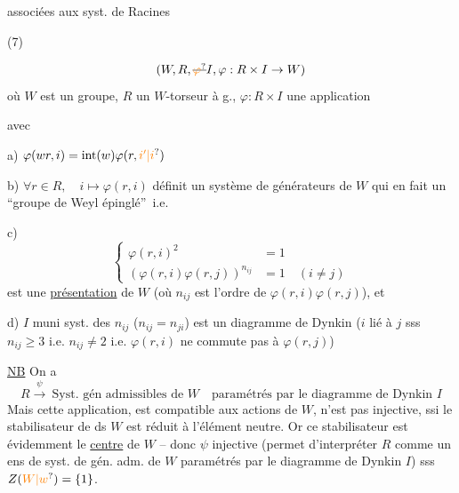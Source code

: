 \begin{flushright}
 associées aux syst. de Racines

(7)
\end{flushright}

\[
(W,R,\deleted{\unsure{\varphi}}I,\varphi:R\times I\to W)
\]
où $W$ est un groupe, $R$ un $W$-torseur à g.,  $\varphi:R\times I$ une  application

avec

a) $\varphi(wr,i)=\operatorname{int}(w)\varphi(r,\unsure{i'|i})$

b) $\forall r\in R,\quad i\mapsto\varphi(r,i)$ définit un système de générateurs de $W$ qui en fait  un \textquotedblleft groupe de Weyl épinglé\textquotedblright\ i.e.

c)
\[
\left\{\begin{aligned}\varphi(r,i)^2&=1\\(\varphi(r,i)\varphi(r,j))^{n_{ij}}&=1\quad(i\ne j)\end{aligned}\right.
\]
est une \uline{présentation} de $W$ (où $n_{ij}$ est l'ordre de $\varphi(r,i)\varphi(r,j)$), et

d) $I$ muni   syst. des $n_{ij}$ ($n_{ij}=n_{ji}$) est un diagramme de Dynkin ($i$ lié à $j$ sss $n_{ij}\geq 3$ i.e. $n_{ij}\ne2$ i.e. $\varphi(r,i)$ ne commute pas à $\varphi(r,j)$)

\uline{NB} On a
\[
 R\xrightarrow{\psi}\ \text{Syst. gén admissibles de }W
 \quad\text{paramétrés par le diagramme de Dynkin }I
\]
Mais cette application,  est   compatible aux actions de $W$, n'est pas  injective,   ssi le stabilisateur de  ds $W$ est réduit à l'élément neutre. Or ce stabilisateur est évidemment le \uline{centre} de $W$ -- donc $\psi$ injective (permet d'interpréter $R$ comme un ens de syst. de gén. adm. de $W$ paramétrés par le diagramme de Dynkin $I$)  sss $Z(\unsure{W|w})=\{1\}$.


